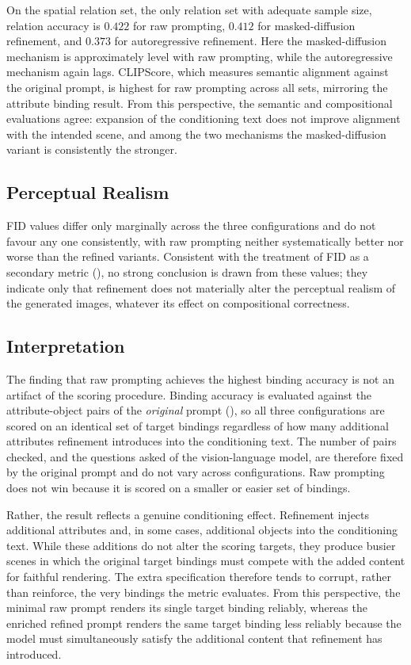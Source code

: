 \documentclass[a4paper,twoside,12pt]{report}
\begin{document}
On the spatial relation set, the only relation set with adequate sample size,
relation accuracy is \(0.422\) for raw prompting, \(0.412\) for masked-diffusion
refinement, and \(0.373\) for autoregressive refinement. Here the
masked-diffusion mechanism is approximately level with raw prompting, while the
autoregressive mechanism again lags. CLIPScore, which measures semantic
alignment against the original prompt, is highest for raw prompting across all
sets, mirroring the attribute binding result. From this perspective, the
semantic and compositional evaluations agree: expansion of the conditioning
text does not improve alignment with the intended scene, and among the two
mechanisms the masked-diffusion variant is consistently the stronger.

\subsection{Perceptual Realism}

FID values differ only marginally across the three configurations and do not
favour any one consistently, with raw prompting neither systematically better
nor worse than the refined variants. Consistent with the treatment of FID as a
secondary metric (), no strong conclusion is drawn from these
values; they indicate only that refinement does not materially alter the
perceptual realism of the generated images, whatever its effect on
compositional correctness.

\subsection{Interpretation}

The finding that raw prompting achieves the highest binding accuracy is not an
artifact of the scoring procedure. Binding accuracy is evaluated against the
attribute-object pairs of the \emph{original} prompt (), so
all three configurations are scored on an identical set of target bindings
regardless of how many additional attributes refinement introduces into the
conditioning text. The number of pairs checked, and the questions asked of the
vision-language model, are therefore fixed by the original prompt and do not
vary across configurations. Raw prompting does not win because it is scored on a
smaller or easier set of bindings.

Rather, the result reflects a genuine conditioning effect. Refinement injects
additional attributes and, in some cases, additional objects into the
conditioning text. While these additions do not alter the scoring targets, they
produce busier scenes in which the original target bindings must compete with
the added content for faithful rendering. The extra specification therefore
tends to corrupt, rather than reinforce, the very bindings the metric
evaluates. From this perspective, the minimal raw prompt renders its single
target binding reliably, whereas the enriched refined prompt renders the same
target binding less reliably because the model must simultaneously satisfy the
additional content that refinement has introduced.
\end{document}
